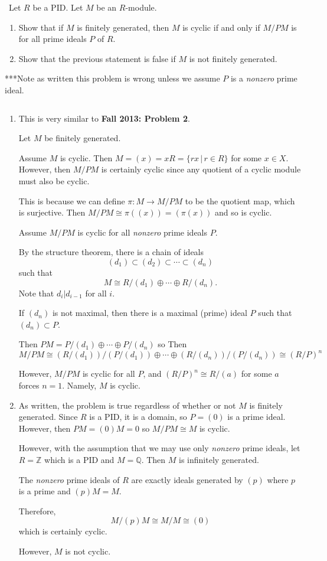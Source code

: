 \documentclass[12pt]{AlgebraQual}
\begin{document}
\begin{problem} $\,$
Let $R$ be a PID. Let $M$ be an $R$-module.
\begin{enumerate}[label=(\alph*)]
    \item Show that if $M$ is finitely generated, then $M$ is cyclic if and only if $M/PM$ is for all prime ideals $P$ of $R$.
    \item Show that the previous statement is false if $M$ is not finitely generated.
\end{enumerate}
\begin{mybox}
***Note as written this problem is wrong unless we assume $P$ is a \textit{nonzero} prime ideal.
\end{mybox}
\end{problem}


\begin{solution}$\,$
\begin{enumerate}[label=(\alph*)]
    \item This is very similar to \textbf{Fall 2013: Problem 2}.

    Let $M$ be finitely generated.

    \boxed{\implies} Assume $M$ is cyclic. Then $M=(x)=xR=\{rx\,|\,r\in R\}$ for some $x\in X$. However, then $M/PM$ is certainly cyclic since any quotient of a cyclic module must also be cyclic.

    This is because we can define $\pi:M\to M/PM$ to be the quotient map, which is surjective. Then $M/PM\cong \pi((x))=(\pi(x))$ and so is cyclic.

    \boxed{\impliedby} Assume $M/PM$ is cyclic for all \textit{nonzero} prime ideals $P$.

    By the structure theorem, there is a chain of ideals $$(d_1)\subset(d_2)\subset\cdots\subset(d_n)$$ such that $$M\cong R/(d_1)\oplus\cdots\oplus R/(d_n).$$ Note that $d_i|d_{i-1}$ for all $i$.

    If $(d_n)$ is not maximal, then there is a maximal (prime) ideal $P$ such that $(d_n)\subset P$.

    Then $PM=P/(d_1)\oplus\cdots\oplus P/(d_n)$ so
    Then $$M/PM\cong (R/(d_1))/(P/(d_1))\oplus\cdots\oplus(R/(d_n))/(P/(d_n))\cong (R/P)^n$$

    However, $M/PM$ is cyclic for all $P$, and $(R/P)^n\cong R/(a)$ for some $a$ forces $n=1.$ Namely, $M$ is cyclic.

    \item As written, the problem is true regardless of whether or not $M$ is finitely generated. Since $R$ is a PID, it is a domain, so $P=(0)$ is a prime ideal. However, then $PM=(0)M=0$ so $M/PM\cong M$ is cyclic.

    However, with the assumption that we may use only \textit{nonzero} prime ideals, let $R=\mathbb{Z}$ which is a PID and $M=\mathbb{Q}$. Then $M$ is infinitely generated.

    The \textit{nonzero} prime ideals of $R$ are exactly ideals generated by $(p)$ where $p$ is a prime and $(p)M=M$.

    Therefore, $$M/(p)M\cong M/M\cong (0)$$ which is certainly cyclic.

    However, $M$ is not cyclic.
\end{enumerate}
\end{solution}
\end{document}
